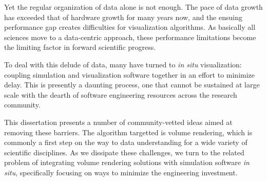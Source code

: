 Yet the regular organization of data alone is not enough.  The pace of
data growth has exceeded that of hardware growth for many years now,
and the ensuing performance gap creates difficulties for visualization
algorithms.  As basically all sciences move to a data-centric approach,
these performance limitations become the limiting factor in forward
scientific progress.

To deal with this delude of data, many have turned to \textit{in situ}
visualization: coupling simulation and visualization software together
in an effort to minimize delay.  This is presently a daunting process,
one that cannot be sustained at large scale with the dearth of software
engineering resources across the research community.

This dissertation presents a number of community-vetted ideas aimed at
removing these barriers.  The algorithm targetted is volume rendering,
which is commonly a first step on the way to data understanding for
a wide variety of scientific disciplines.  As we dissipate these
challenges, we turn to the related problem of integrating volume
rendering solutions with
simulation software \textit{in situ}, specifically focusing on ways to
minimize the engineering investment.

